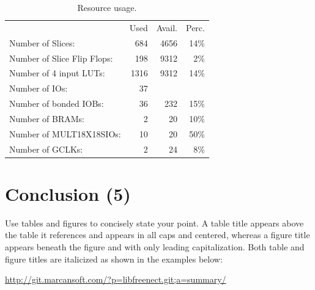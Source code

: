\documentclass[12pt, letterpaper]{article}
\begin{document}
\begin{table}[h]
\centering
\begin{tabular}{l  r  r  r}
                                       & Used  & Avail. & Perc. \\
  Number of Slices:                    &  684  & 4656  &  14\%  \\
  Number of Slice Flip Flops:          &  198  & 9312  &   2\%  \\
  Number of 4 input LUTs:              & 1316  & 9312  &  14\%  \\
  Number of IOs:                       &   37  &       &      \\
  Number of bonded IOBs:               &   36  &  232  &  15\%  \\
  Number of BRAMs:                     &    2  &   20  &  10\%  \\
  Number of MULT18X18SIOs:             &   10  &   20  &  50\%  \\
  Number of GCLKs:                     &    2  &   24  &   8\%  \\
\end{tabular}
\caption{Resource usage.}
\label{tab:usage}
\end{table}


\section{Conclusion (5)}
Use tables and figures to concisely state your point. A table title appears above the table it references and appears in all caps and centered, whereas a figure title appears beneath the figure and with only leading capitalization. Both table and figure titles are italicized as shown in the examples below:



\begin{thebibliography}{10}
 \url{http://git.marcansoft.com/?p=libfreenect.git;a=summary/}
\end{thebibliography}
\end{document}
